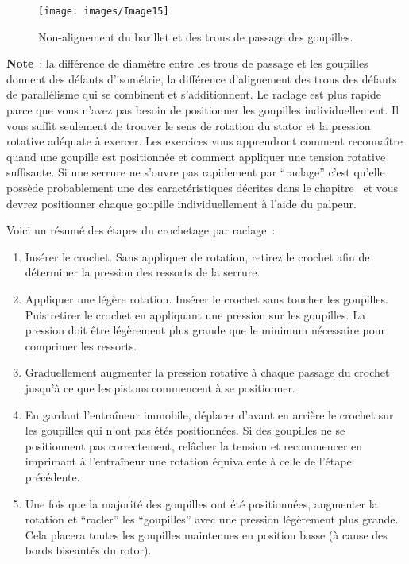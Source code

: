 \documentclass[a4paper,french,11pt,twoside]{report}
\begin{document}
\begin{figure}[ht]
  \begin{center}
    \texttt{[image: images/Image15]}
    \caption{Non-alignement du barillet et des trous de passage des goupilles.\label{non-alignement}}
  \end{center}
\end{figure}


\textbf{Note}~: la différence de diamètre entre les trous de passage et les goupilles donnent des défauts d'isométrie, la différence d'alignement des trous des défauts de parallélisme qui se combinent et s'additionnent. Le raclage est plus rapide parce que vous n'avez pas besoin de positionner les goupilles individuellement. Il vous suffit seulement de trouver le sens de rotation du stator et la pression rotative adéquate à exercer. Les exercices vous apprendront comment reconnaître quand une goupille est positionnée et comment appliquer une tension rotative suffisante. Si une serrure ne s'ouvre pas rapidement par \enquote{raclage} c'est qu'elle possède probablement une des caractéristiques décrites dans le chapitre~ et vous devrez positionner chaque goupille individuellement à l'aide du palpeur.

Voici un résumé des étapes du crochetage par raclage~:

\begin{enumerate}
    \item{Insérer le crochet. Sans appliquer de rotation, retirez le crochet afin de déterminer la pression des ressorts de la serrure.}
    \item{Appliquer une légère rotation. Insérer le crochet sans  toucher les goupilles. Puis retirer le crochet en appliquant une  pression sur les goupilles. La pression doit être légèrement plus grande  que le minimum nécessaire pour comprimer les ressorts.}
    \item{Graduellement augmenter la pression rotative à chaque passage du crochet jusqu'à ce que les pistons commencent à se positionner.}
    \item{En gardant l'entraîneur immobile, déplacer d'avant en  arrière le crochet sur les goupilles qui n'ont pas étés positionnées. Si  des goupilles ne se positionnent pas correctement, relâcher la tension  et recommencer en imprimant à l'entraîneur une rotation équivalente à  celle de l'étape précédente.}
    \item{Une fois que la majorité des goupilles ont été  positionnées, augmenter la rotation et \enquote{racler} les  \enquote{goupilles} avec une pression légèrement plus grande. Cela  placera toutes les goupilles maintenues en position basse (à cause des bords biseautés du rotor).}
\end{enumerate}
\end{document}

